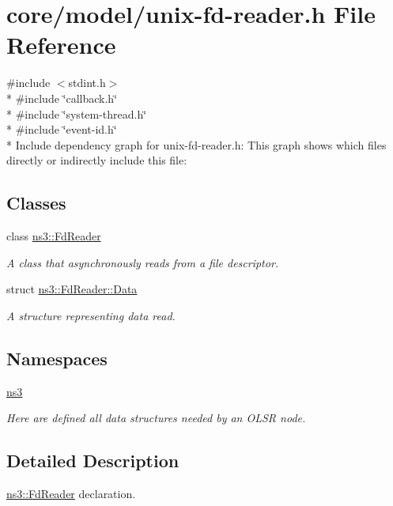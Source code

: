 \hypertarget{unix-fd-reader_8h}{}\section{core/model/unix-\/fd-\/reader.h File Reference}
\label{unix-fd-reader_8h}
{\ttfamily \#include $<$stdint.\+h$>$}\\*
{\ttfamily \#include \char`\"{}callback.\+h\char`\"{}}\\*
{\ttfamily \#include \char`\"{}system-\/thread.\+h\char`\"{}}\\*
{\ttfamily \#include \char`\"{}event-\/id.\+h\char`\"{}}\\*
Include dependency graph for unix-\/fd-\/reader.h\+:
This graph shows which files directly or indirectly include this file\+:
\subsection*{Classes}
\begin{DoxyCompactItemize}
\item 
class \hyperlink{classns3_1_1FdReader}{ns3\+::\+Fd\+Reader}
\begin{DoxyCompactList}\small\item\em A class that asynchronously reads from a file descriptor. \end{DoxyCompactList}\item 
struct \hyperlink{structns3_1_1FdReader_1_1Data}{ns3\+::\+Fd\+Reader\+::\+Data}
\begin{DoxyCompactList}\small\item\em A structure representing data read. \end{DoxyCompactList}\end{DoxyCompactItemize}
\subsection*{Namespaces}
\begin{DoxyCompactItemize}
\item 
 \hyperlink{namespacens3}{ns3}
\begin{DoxyCompactList}\small\item\em Here are defined all data structures needed by an O\+L\+SR node. \end{DoxyCompactList}\end{DoxyCompactItemize}


\subsection{Detailed Description}
\hyperlink{classns3_1_1FdReader}{ns3\+::\+Fd\+Reader} declaration. 